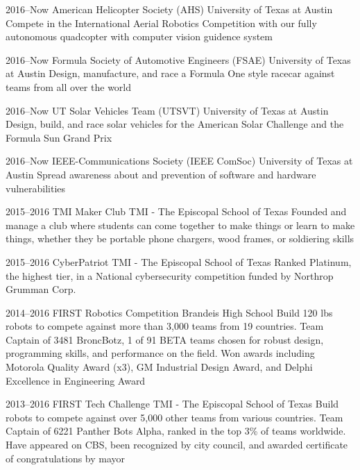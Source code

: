 \documentclass[]{friggeri-cv} %
\begin{document}
\begin{entrylist}

	\entry
	{2016--Now}
	{American Helicopter Society (AHS)}
	{University of Texas at Austin}
	{Compete in the International Aerial Robotics Competition with our fully autonomous quadcopter with computer vision guidence system}


	\entry
	{2016--Now}
	{Formula Society of Automotive Engineers (FSAE)}
	{University of Texas at Austin}
	{Design, manufacture, and race a Formula One style racecar against teams from all over the world}


	\entry
	{2016--Now}
	{UT Solar Vehicles Team (UTSVT)}
	{University of Texas at Austin}
	{Design, build, and race solar vehicles for the American Solar Challenge and the Formula Sun Grand Prix}


	\entry
	{2016--Now}
	{IEEE-Communications Society (IEEE ComSoc)}
	{University of Texas at Austin}
	{Spread awareness about and prevention of software and hardware vulnerabilities}


	\entry
	{2015--2016}
	{TMI Maker Club}
	{TMI - The Episcopal School of Texas}
	{Founded and manage a club where students can come together to make things or learn to make things, whether they be portable phone chargers, wood frames, or soldiering skills}


	\entry
	{2015--2016}
	{CyberPatriot}
	{TMI - The Episcopal School of Texas}
	{Ranked Platinum, the highest tier, in a National cybersecurity competition funded by Northrop Grumman Corp.}


	\entry
	{2014--2016}
	{FIRST Robotics Competition}
	{Brandeis High School}
	{Build 120 lbs robots to compete against more than 3,000 teams from 19 countries. Team Captain of 3481 BroncBotz, 1 of 91 BETA teams chosen for robust design, programming skills, and performance on the field. Won awards including Motorola Quality Award (x3), GM Industrial Design Award, and Delphi Excellence in Engineering Award}


	\entry
	{2013--2016}
	{FIRST Tech Challenge}
	{TMI - The Episcopal School of Texas}
	{Build robots to compete against over 5,000 other teams from various countries. Team Captain of 6221 Panther Bots Alpha, ranked in the top 3\% of teams worldwide. Have appeared on CBS, been recognized by city council, and awarded certificate of congratulations by mayor}

\end{entrylist}
\end{document}
